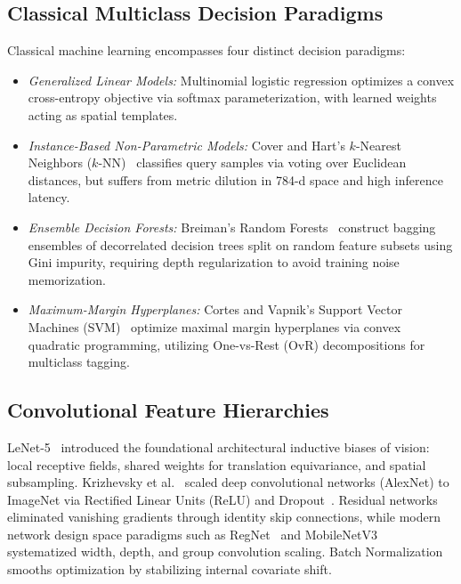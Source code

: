 \documentclass[conference]{IEEEtran}
\begin{document}
\subsection{Classical Multiclass Decision Paradigms}
Classical machine learning encompasses four distinct decision paradigms:
\begin{itemize}
    \item \emph{Generalized Linear Models:} Multinomial logistic regression optimizes a convex cross-entropy objective via softmax parameterization, with learned weights acting as spatial templates.
    \item \emph{Instance-Based Non-Parametric Models:} Cover and Hart's $k$-Nearest Neighbors ($k$-NN)~\cite{cover1967knn} classifies query samples via voting over Euclidean distances, but suffers from metric dilution in 784-d space and high inference latency.
    \item \emph{Ensemble Decision Forests:} Breiman's Random Forests~\cite{breiman2001rf} construct bagging ensembles of decorrelated decision trees split on random feature subsets using Gini impurity, requiring depth regularization to avoid training noise memorization.
    \item \emph{Maximum-Margin Hyperplanes:} Cortes and Vapnik's Support Vector Machines (SVM)~\cite{cortes1995svm} optimize maximal margin hyperplanes via convex quadratic programming, utilizing One-vs-Rest (OvR) decompositions for multiclass tagging.
\end{itemize}

\subsection{Convolutional Feature Hierarchies}
LeNet-5~\cite{lecun1998gradient} introduced the foundational architectural inductive biases of vision: local receptive fields, shared weights for translation equivariance, and spatial subsampling. Krizhevsky et al.~\cite{krizhevsky2012imagenet} scaled deep convolutional networks (AlexNet) to ImageNet via Rectified Linear Units (ReLU) and Dropout~\cite{srivastava2014dropout}. Residual networks~\cite{he2016deep} eliminated vanishing gradients through identity skip connections, while modern network design space paradigms such as RegNet~\cite{radosavovic2020designing} and MobileNetV3~\cite{howard2019searching} systematized width, depth, and group convolution scaling. Batch Normalization~\cite{ioffe2015batch} smooths optimization by stabilizing internal covariate shift.
\end{document}
